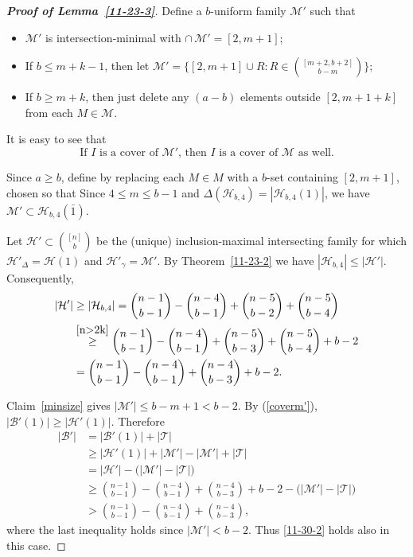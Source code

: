 \documentclass[11pt]{article}
\newcommand{\m}{\mathcal}
\begin{document}
\begin{proof}[{\bf Proof of Lemma~\ref{11-23-3}}]
Define a $b$-uniform family $\mathcal{M}'$ such that 
\begin{itemize}
    \item $\mathcal{M}'$ is intersection‑minimal with $\cap \,\mathcal{M}' = [2, m+1]$;
    \item If $b\le m+k-1$, then let $\m M'=\{[2,m+1]\cup R: R\in {[m+2,b+2]\choose b-m}\}$;
    \item If $b\ge m+k$, then just delete any $(a-b)$ elements outside $[2,m+1+k]$ from each $M\in \m M$.
\end{itemize}
It is easy to see that
\begin{equation}\label{coverm'}
\text{If $I$ is a cover of $\m M'$, then $I$ is a cover of $\m M$ as well.} 
\end{equation}

Since $a\ge b$, define  by replacing each $M\in M$ with a $b$-set containing $[2, m+1]$, chosen so that 
Since $4\le m\le b-1$ and $\Delta(\m H_{b,4})=|\m H_{b,4}(1)|$, we have $\mathcal{M}' \subset \mathcal{H}_{b,4}(\bar{1})$. 

Let $\mathcal{H}'\subset {[n]\choose b}$ be the (unique) inclusion-maximal intersecting family for which $\mathcal{H}'_{\Delta} = \mathcal{H}(1)$ and $\mathcal{H}'_{\gamma} = \mathcal{M}'$.
By Theorem~\ref{11-23-2} we have $|\mathcal H
_{b,4}|\le |\mathcal{H}'|$. 
Consequently,  
\begin{align*}
|\mathcal{H}'| &\ge |\mathcal{H}_{b,4}|
   = \binom{n-1}{b-1} - \binom{n-4}{b-1} + \binom{n-5}{b-2} + \binom{n-5}{b-4} \\
   &\stackrel{\eqref{n>2k}}{\ge} 
      \binom{n-1}{b-1} - \binom{n-4}{b-1} 
      + \binom{n-5}{b-3} + \binom{n-5}{b-4} + b-2 \\
   &= \binom{n-1}{b-1} - \binom{n-4}{b-1} + \binom{n-4}{b-3} + b-2.
\end{align*}

 Claim~\ref{minsize} gives $|\mathcal{M}'|\le b-m+1< b-2$.
By (\ref{coverm'}), $|\mathcal{B}'(1)|\ge|\mathcal{H}'(1)|$.
Therefore
\begin{align*}
|\mathcal{B}'|
   &= |\mathcal{B}'(1)| + |\mathcal{T}| \\
   &\ge |\mathcal{H}'(1)| + |\mathcal{M}'| - |\mathcal{M}'| + |\mathcal{T}| \\
   &= |\mathcal{H}'| - \bigl(|\mathcal{M}'| - |\mathcal{T}|\bigr) \\
   &\ge \binom{n-1}{b-1} - \binom{n-4}{b-1} + \binom{n-4}{b-3} + b-2
        - \bigl(|\mathcal{M}'| - |\mathcal{T}|\bigr) \\
   &> \binom{n-1}{b-1} - \binom{n-4}{b-1} + \binom{n-4}{b-3},
\end{align*}
where the last inequality holds since $|\mathcal{M}'| < b-2$. 
Thus \eqref{11-30-2} holds also in this case.




\end{proof}
\end{document}
